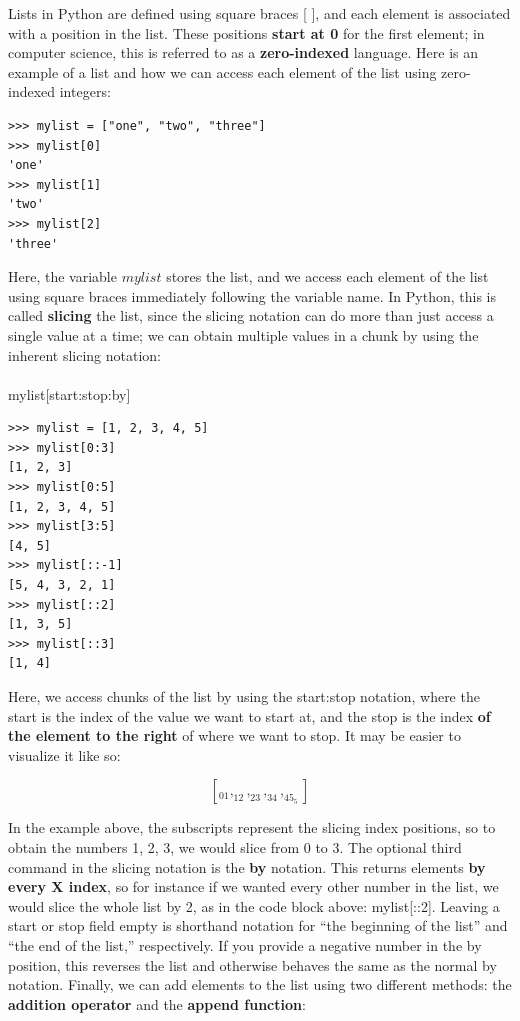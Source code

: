 \documentclass[a4paper,11pt]{article}
\begin{document}
Lists in Python are defined using square braces [ ], and each element is associated with a position in the 
list.  These positions \textbf{start at 0} for the first element; in computer science, this is referred to 
as a \textbf{zero-indexed} language.  Here is an example of a list and how we can access each element of the 
list using zero-indexed integers:

\vspace{3mm}
\begin{lstlisting}
>>> mylist = ["one", "two", "three"]
>>> mylist[0]
'one'
>>> mylist[1]
'two'
>>> mylist[2]
'three'
\end{lstlisting}
\vspace{3mm}

Here, the variable $mylist$ stores the list, and we access each element of the list using square braces immediately 
following the variable name.  In Python, this is called \textbf{slicing} the list, since the slicing notation can 
do more than just access a single value at a time; we can obtain multiple values in a chunk by using the inherent 
slicing notation: \\
\\
mylist[start:stop:by]

\vspace{3mm}
\begin{lstlisting}
>>> mylist = [1, 2, 3, 4, 5]
>>> mylist[0:3]
[1, 2, 3]
>>> mylist[0:5]
[1, 2, 3, 4, 5]
>>> mylist[3:5]
[4, 5]
>>> mylist[::-1]
[5, 4, 3, 2, 1]
>>> mylist[::2]
[1, 3, 5]
>>> mylist[::3]
[1, 4]
\end{lstlisting}
\vspace{3mm}

Here, we access chunks of the list by using the start:stop notation, where the start is the index of the value we 
want to start at, and the stop is the index \textbf{of the element to the right} of where we want to stop.  It may 
be easier to visualize it like so:

\[
 [_01, _12, _23, _34, _45_5]
\]

In the example above, the subscripts represent the slicing index positions, so to obtain the numbers 1, 2, 3, we 
would slice from 0 to 3.  The optional third command in the slicing notation is the \textbf{by} notation.  This 
returns elements \textbf{by every X index}, so for instance if we wanted every other number in the list, we would 
slice the whole list by 2, as in the code block above: mylist[::2].  Leaving a start or stop field empty is shorthand 
notation for ``the beginning of the list'' and ``the end of the list,'' respectively.  If you provide a negative number 
in the by position, this reverses the list and otherwise behaves the same as the normal by notation.  Finally, 
we can add elements to the list using two different methods: the \textbf{addition operator} and the \textbf{append function}:
\end{document}
